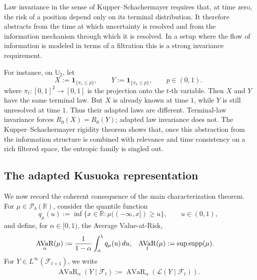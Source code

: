 \documentclass[a4paper]{amsart}
\theoremstyle{definition}
\DeclareMathOperator{\AVaR}{AVaR}
\newcommand{\R}{\mathbb{R}}
\newcommand{\F}{\mathcal{F}}
\newcommand{\supp}{\textup{supp}}
\newcommand{\law}{\mathcal{L}}
\newcommand{\Pc}{\mathcal P}
\begin{document}

\medskip

Law invariance in the sense of Kupper--Schachermayer requires that, at time
zero, the risk of a position depend only on its terminal distribution. It
therefore abstracts from the time at which uncertainty is resolved and from the
information mechanism through which it is resolved. In a setup where the flow of information is modeled in terms of a filtration this is
a strong invariance requirement.


For instance, on \(\mathbb U_2\), let
\[
X:=\mathbf 1_{\{\pi_1\le p\}},
\qquad
Y:=\mathbf 1_{\{\pi_2\le p\}},
\qquad p\in(0,1).
\]
where $\pi_t :[0,1]^2 \to [0,1]$ is the projection onto the $t$-th variable.
Then \(X\) and \(Y\) have the same terminal law. But \(X\) is already known at
time \(1\), while \(Y\) is still unresolved at time \(1\). Thus their adapted laws
are different. Terminal-law invariance forces \(R_0(X)=R_0(Y)\); adapted law
invariance does not. 
The Kupper--Schachermayer rigidity theorem shows that, once this abstraction
from the information structure is combined with relevance and time consistency
on a rich filtered space, the entropic family is singled out.


\subsection{The adapted Kusuoka representation}
\label{subsec:adapted-kusuoka-results}

We now record the coherent consequence of the main characterization theorem.
For \(\mu\in\Pc_b(\R)\), consider the quantile function
\[
q_\mu(u):=\inf\{x\in\R:\mu((-\infty,x])\ge u\},
\qquad u\in(0,1),
\]
and define, for \(\alpha\in[0,1)\), the Average Value-at-Risk,
\begin{align}
\AVaR_\alpha(\mu)
&:=
\frac{1}{1-\alpha}\int_\alpha^1 q_\mu(u)\,du,
&
\AVaR_1(\mu)
&:=\sup\supp(\mu).
\label{eq:AVaR-law-definition}
\end{align}
For \(Y\in L^\infty(\F_{t+1})\), we write
\begin{align}
\AVaR_\alpha(Y\mid\F_t)
:=
\AVaR_\alpha(\law(Y\mid\F_t)).
\label{eq:conditional-AVaR-definition}
\end{align}
\end{document}
